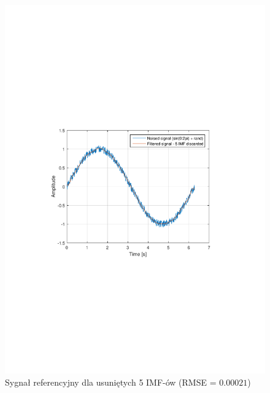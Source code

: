 \begin{figure}[!htb]
    \begin{center}
        \includegraphics[width=13cm,trim=4cm 9.5cm 4cm 10cm,clip]
        {../img/sin_rmse5.pdf}
    \end{center}
    \caption{Sygnał referencyjny dla usuniętych 5 IMF-ów (RMSE = $0.00021$)}
    \label{rys:sin_rmse5}
\end{figure}

